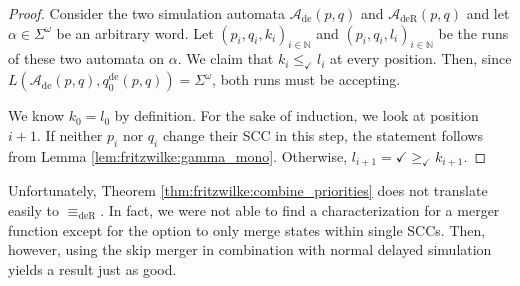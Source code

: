 \begin{proof} 
	Consider the two simulation automata $\mathcal{A}_\text{de}(p, q)$ and $\mathcal{A}_\text{deR}(p, q)$ and let $\alpha \in \Sigma^\omega$ be an arbitrary word. Let $(p_i, q_i, k_i)_{i \in \mathbb{N}}$ and $(p_i, q_i, l_i)_{i \in \mathbb{N}}$ be the runs of these two automata on $\alpha$. We claim that $k_i \leq_\checkmark l_i$ at every position. Then, since $L(\mathcal{A}_\text{de}(p, q), q_0^\text{de}(p, q)) = \Sigma^\omega$, both runs must be accepting.
	
	We know $k_0 = l_0$ by definition. For the sake of induction, we look at position $i+1$. If neither $p_i$ nor $q_i$ change their SCC in this step, the statement follows from Lemma \ref{lem:fritzwilke:gamma_mono}. Otherwise, $l_{i+1} = \checkmark \geq_\checkmark k_{i+1}$.
\end{proof}

\vspace{5pt}

Unfortunately, Theorem \ref{thm:fritzwilke:combine_priorities} does not translate easily to $\equiv_\text{deR}$. In fact, we were not able to find a characterization for a merger function except for the option to only merge states within single SCCs. Then, however, using the skip merger in combination with normal delayed simulation yields a result just as good.




















